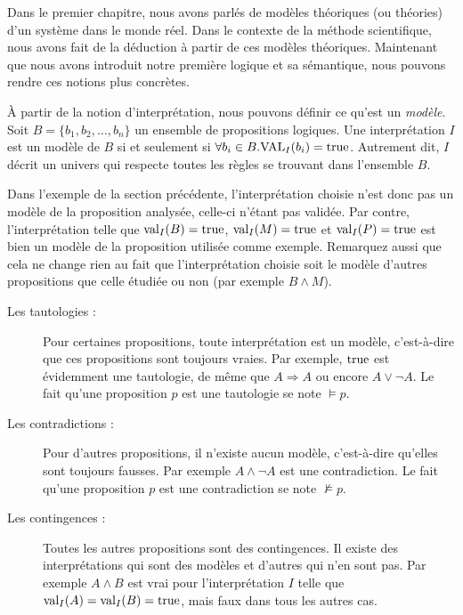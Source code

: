 Dans le premier chapitre, nous avons parlés de modèles théoriques (ou théories)
d'un système dans le monde réel.
Dans le contexte de la méthode scientifique,
nous avons fait de la déduction à partir de ces modèles théoriques.
Maintenant que nous avons introduit notre première logique et sa sémantique,
nous pouvons rendre ces notions plus concrètes.

À partir de la notion d’interprétation, nous pouvons définir ce qu’est
un \textit{modèle}. Soit $B = \{b_1, b_2, \dots, b_n \}$ un ensemble de
propositions logiques. Une interprétation $I$ est un modèle de $B$ si et
seulement si $\forall b_i \in B. \mathrm{VAL}_I(b_i) = \mathrm{true}$. Autrement dit, $I$
décrit un univers qui respecte toutes les règles se trouvant dans l’ensemble
$B$.

Dans l'exemple de la section précédente, l’interprétation choisie n’est donc pas un modèle
de la proposition analysée, celle-ci n’étant pas validée. Par contre, 
l’interprétation telle que $\mathrm{val}_I(B) = \mathrm{true}$, $\mathrm{val}_I(M) = \mathrm{true}$ et
$\mathrm{val}_I(P) = \mathrm{true}$ est bien un modèle de la proposition utilisée comme
exemple. Remarquez aussi que cela ne change rien au fait que l’interprétation
choisie soit le modèle d’autres propositions que celle étudiée ou non (par exemple $B
\land M$).

\begin{description}\item[Les tautologies :] Pour certaines propositions, toute interprétation est un modèle, c’est-à-dire que ces propositions sont toujours
  vraies. Par exemple, $\mathrm{true}$ est évidemment une tautologie, de même que $A
  \Rightarrow A$ ou encore $A \lor \lnot A$. Le fait qu’une proposition $p$ est
  une tautologie se note $\vDash p$.
\item[Les contradictions :] Pour d’autres propositions, il n’existe aucun
  modèle, c’est-à-dire qu’elles sont toujours fausses. Par exemple $A \land
  \lnot A$ est une contradiction. Le fait qu’une proposition $p$ est une
  contradiction se note $\nvDash p$.
\item[Les contingences :] Toutes les autres propositions sont des contingences. Il
  existe des interprétations qui sont des modèles et d’autres qui n’en sont
  pas. Par exemple $A \land B$ est vrai pour l’interprétation $I$ telle que
  $\mathrm{val}_I(A) = \mathrm{val}_I(B) = \mathrm{true}$, mais faux dans tous les autres cas.
\end{description}

